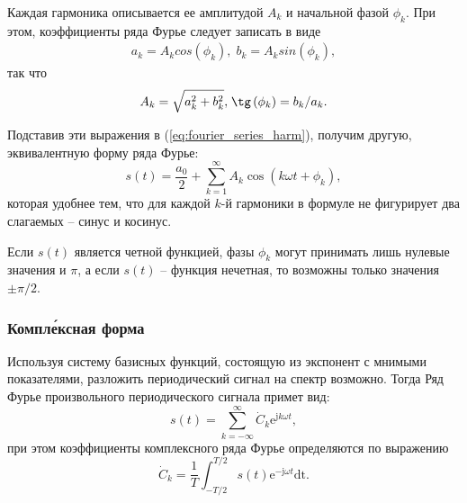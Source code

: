 \documentclass[12pt,a4paper]{article}
\begin{document}
Каждая гармоника описывается ее амплитудой $A_k$ и начальной фазой $\phi_k$. При этом, коэффициенты ряда Фурье следует записать в виде
\begin{eqnarray}
\nonumber
{a_k = A_k cos \left(\phi_k\right) ,}\;
{b_k = A_k sin \left(\phi_k\right) ,}
\end{eqnarray}
так что
\begin{eqnarray}
\nonumber
{A_k=\sqrt{a_k^2+b_k^2} ,}\;
{\tg\left(\phi_k \right) =b_k/a_k .}
\end{eqnarray}

Подставив эти выражения в (\ref{eq:fourier_series_harm}), получим другую, эквивалентную форму ряда Фурье:
\begin{equation}\label{eq:fourier_series_real}
s\left( t\right) = \frac{a_0}{2}+\sum_{k=1}^{\infty} {A_k \cos\left( k\omega t+\phi_k\right)},
\end{equation}
которая удобнее тем, что для каждой $k$-й гармоники в формуле не фигурирует два слагаемых -- синус и косинус.

Если $s\left(t\right)$ является четной функцией, фазы $\phi_k$ могут принимать лишь нулевые значения и $\pi$, а если $s\left(t\right)$ -- функция нечетная, то возможны только значения $\pm\pi/2$.

\subsubsection{Компл\'{е}ксная форма}

Используя систему базисных функций, состоящую из экспонент с мнимыми показателями, разложить периодический сигнал на спектр возможно. Тогда Ряд Фурье произвольного периодического сигнала примет вид:
\begin{equation}
\label{eq:fourier_series_exp}
s\left( t\right)=\sum_{k=-\infty}^{\infty}\dot{C}_k \mathrm{e}^{\mathrm{j}k\omega t},
\end{equation}
при этом коэффициенты комплексного ряда Фурье определяются по выражению
\begin{equation}\label{eq:fourier_koef}
\dot{C}_k = \frac{1}{T}\int_{-T/2}^{T/2}s\left( t\right)\mathrm{e}^{-\mathrm{j}\omega t}\mathrm{dt}.
\end{equation}
\end{document}
